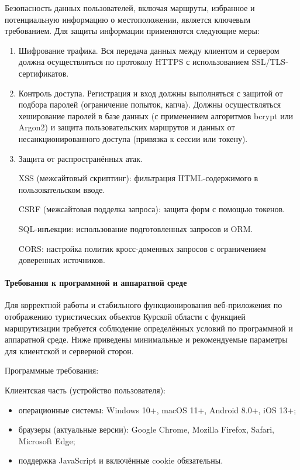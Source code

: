 Безопасность данных пользователей, включая маршруты, избранное и потенциальную информацию о местоположении, является ключевым требованием. Для защиты информации применяются следующие меры:
\begin{enumerate}
	\item Шифрование трафика. Вся передача данных между клиентом и сервером должна осуществляться по протоколу HTTPS с использованием SSL/TLS-сертификатов.
	\item Контроль доступа. Регистрация и вход должны выполняться с защитой от подбора паролей (ограничение попыток, капча). Должны осуществляться хеширование паролей в базе данных (с применением алгоритмов bcrypt или Argon2) и защита пользовательских маршрутов и данных от несанкционированного доступа (привязка к сессии или токену).
	\item Защита от распространённых атак. 
	
	XSS (межсайтовый скриптинг): фильтрация HTML-содержимого в пользовательском вводе.
	
	CSRF (межсайтовая подделка запроса): защита форм с помощью токенов.
	
	SQL-инъекции: использование подготовленных запросов и ORM.
	
	CORS: настройка политик кросс-доменных запросов с ограничением доверенных источников.
\end{enumerate}

\paragraph{Требования к программной и аппаратной среде}

Для корректной работы и стабильного функционирования веб-приложения по отображению туристических объектов Курской области с функцией маршрутизации требуется соблюдение определённых условий по программной и аппаратной среде. Ниже приведены минимальные и рекомендуемые параметры для клиентской и серверной сторон.

Программные требования:

Клиентская часть (устройство пользователя):
\begin{itemize}
	\item операционные системы: Windows 10+, macOS 11+, Android 8.0+, iOS 13+;
	\item браузеры (актуальные версии): Google Chrome, Mozilla Firefox, Safari, Microsoft Edge;
	\item поддержка JavaScript и включённые cookie обязательны.
\end{itemize}

